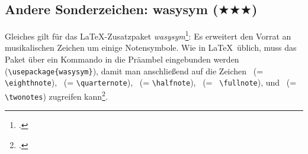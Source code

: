 %
%
%



\subsection{Andere Sonderzeichen: wasysym ($\bigstar\bigstar\bigstar$)}

Gleiches gilt für das \LaTeX-Zusatzpaket \textit{wasysym}\footcite[vgl.][\nopage
wp]{CtanWasysym2018a}: Es erweitert den Vorrat an musikalischen Zeichen um
einige Notensymbole. Wie in \LaTeX\ üblich, muss das Paket über ein Kommando in
die Präambel eingebunden werden
(\texttt{\textbackslash{usepackage\{wasysym\}}}), damit man anschließend auf die
Zeichen \eighthnote \ (= \texttt{\small \textbackslash{eighthnote}}),
\quarternote \ (= \texttt{\small \textbackslash{quarternote}}), \halfnote \ (=
\texttt{\small \textbackslash{halfnote}}), \fullnote \ (= \texttt{\small
\textbackslash{fullnote}}), und \twonotes \ (= \texttt{\small
\textbackslash{twonotes}}) zugreifen kann\footcite[vgl.][2]{Kielhorn2003a}.

